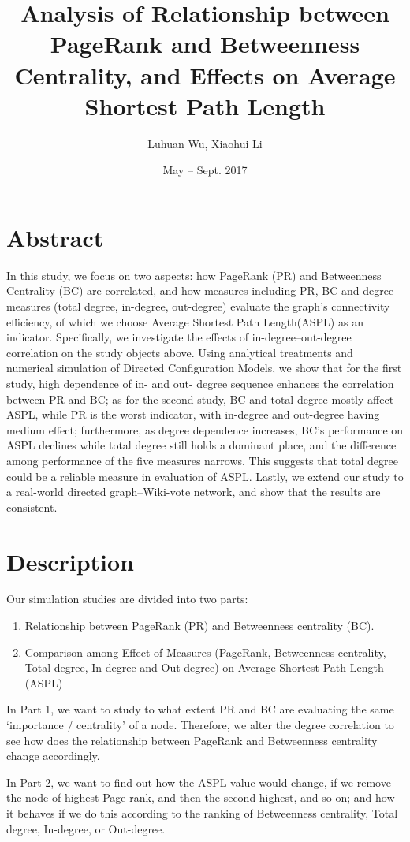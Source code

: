 \documentclass{article}
\title{Analysis of Relationship between PageRank and Betweenness Centrality, and Effects on Average Shortest Path Length}
\author{\vspace{-6ex} Luhuan Wu, Xiaohui Li}
\date{May -- Sept. 2017}
\begin{document}
\maketitle

\section{Abstract}
\par In this study, we focus on two aspects: how PageRank (PR) and Betweenness Centrality (BC) are correlated, and how measures including PR, BC and degree measures (total degree, in-degree, out-degree) evaluate the graph's connectivity efficiency, of which we choose Average Shortest Path Length(ASPL) as an indicator. Specifically, we investigate the effects of in-degree--out-degree correlation on the study objects above. Using analytical treatments and numerical simulation of Directed Configuration Models, we show that for the first study, high dependence of in- and out- degree sequence enhances the correlation between PR and BC; as for the second study, BC and total degree mostly affect ASPL, while PR is the worst indicator, with in-degree and out-degree having medium effect; furthermore, as degree dependence increases, BC's performance on ASPL declines while total degree still holds a dominant place, and the difference among performance of the five measures narrows. This suggests that total degree could be a reliable measure in evaluation of ASPL. Lastly, we extend our study to a real-world directed graph--Wiki-vote network, and show that the results are consistent. 

\section{Description}
Our simulation studies are divided into two parts:
\begin{enumerate}
\item Relationship between PageRank (PR) and Betweenness centrality (BC).
\item Comparison among Effect of Measures (PageRank, Betweenness centrality, Total degree, In-degree and Out-degree) on Average Shortest Path Length (ASPL)
\end{enumerate}
\par In Part 1, we want to study to what extent PR and BC are evaluating the same `importance / centrality' of a node. Therefore, we alter the degree correlation to see how does the relationship between PageRank and Betweenness centrality change accordingly.
\par In Part 2, we want to find out how the ASPL value would change, if we remove the node of highest Page rank, and then the second highest, and so on; and how it behaves if we do this according to the ranking of Betweenness centrality, Total degree,  In-degree, or Out-degree.  \\
\end{document}
